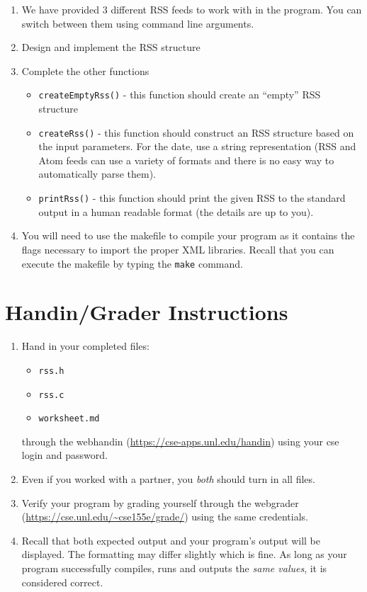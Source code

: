 \documentclass[12pt]{scrartcl}
\begin{document}
\begin{enumerate}
  \item We have provided 3 different RSS feeds to work with in the
    program.  You can switch between them using command line arguments.
  \item Design and implement the RSS structure 
  \item Complete the other functions
  \begin{itemize}
    \item \texttt{createEmptyRss()} - this function should create an 
  	``empty'' RSS structure
    \item \texttt{createRss()} - this function should construct an RSS 
	structure based on the input parameters.  For the date, use a string
	representation (RSS and Atom feeds can use a variety of formats and
	there is no easy way to automatically parse them).
	\item \texttt{printRss()} - this function should print the given RSS 
	to the standard output in a human readable format (the details are up to you).  
  \end{itemize}	
  \item You will need to use the makefile to compile your program as it 
	contains the flags necessary to import the proper XML libraries.  
	Recall that you can execute the makefile by typing the \texttt{make} 
	command.
\end{enumerate}

\section{Handin/Grader Instructions}

\begin{enumerate}
  \item Hand in your completed files:
  \begin{itemize}
    \item \texttt{rss.h}
    \item \texttt{rss.c}
    \item \texttt{worksheet.md}
  \end{itemize}
  through the webhandin (\url{https://cse-apps.unl.edu/handin}) 
  using your cse login and password.  
  \item Even if you worked with a partner, you \emph{both} should
  turn in all files.
  \item Verify your program by grading yourself through the
  webgrader (\url{https://cse.unl.edu/~cse155e/grade/}) using the
  same credentials.
  \item Recall that both expected output and your program's output
  will be displayed.  The formatting may differ slightly which is fine.
  As long as your program successfully compiles, runs and outputs 
  the \emph{same values}, it is considered correct.
\end{enumerate}
\end{document}
